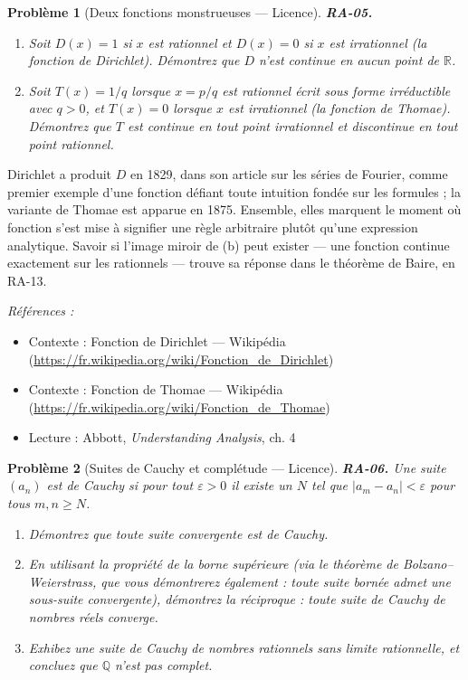\documentclass[11pt]{article}
\newtheorem{problem}{Problème}
\newenvironment{refs}{\par\small\noindent\emph{Références :}\begin{itemize}\setlength\itemsep{0pt}}{\end{itemize}\normalsize}
\begin{document}
\bigskip

\begin{problem}[{Deux fonctions monstrueuses --- Licence}]
\textbf{RA-05.} \begin{enumerate}
\item[(a)] Soit $ D(x) = 1 $ si $ x $ est rationnel et
$ D(x) = 0 $ si $ x $ est irrationnel (la fonction de Dirichlet). Démontrez que $ D $ n'est
continue en aucun point de $ \mathbb{R} $.
\item[(b)] Soit $ T(x) = 1/q $ lorsque $ x = p/q $ est
rationnel écrit sous forme irréductible avec $ q > 0 $, et $ T(x) = 0 $ lorsque $ x $ est
irrationnel (la fonction de Thomae). Démontrez que $ T $ est continue en tout point irrationnel et
discontinue en tout point rationnel.
\end{enumerate}

\end{problem}

\noindent Dirichlet a produit $ D $ en 1829, dans son article sur les séries de Fourier,
comme premier exemple d'une fonction défiant toute intuition fondée sur les formules ; la variante de
Thomae est apparue en 1875. Ensemble, elles marquent le moment où \og{} fonction \fg{} s'est mise à
signifier une règle arbitraire plutôt qu'une expression analytique. Savoir si l'image miroir de (b)
peut exister --- une fonction continue exactement sur les rationnels --- trouve sa réponse dans le
théorème de Baire, en RA-13.

\begin{refs}
\item Contexte : Fonction de Dirichlet --- Wikipédia (\url{https://fr.wikipedia.org/wiki/Fonction_de_Dirichlet})
\item Contexte : Fonction de Thomae --- Wikipédia (\url{https://fr.wikipedia.org/wiki/Fonction_de_Thomae})
\item Lecture : Abbott, \textit{Understanding Analysis}, ch. 4
\end{refs}

\bigskip

\begin{problem}[{Suites de Cauchy et complétude --- Licence}]
\textbf{RA-06.} Une suite $ (a_n) $ est \textit{de Cauchy} si pour tout
$ \varepsilon > 0 $ il existe un $ N $ tel que $ |a_m - a_n| < \varepsilon $ pour
tous $ m, n \ge N $.
\begin{enumerate}
\item[(a)] Démontrez que toute suite convergente est de Cauchy.
\item[(b)] En utilisant la propriété de la
borne supérieure (via le théorème de Bolzano--Weierstrass, que vous démontrerez également : toute
suite bornée admet une sous-suite convergente), démontrez la réciproque : toute suite de Cauchy de
nombres réels converge.
\item[(c)] Exhibez une suite de Cauchy de nombres rationnels sans limite
rationnelle, et concluez que $ \mathbb{Q} $ n'est pas complet.
\end{enumerate}

\end{problem}
\end{document}
